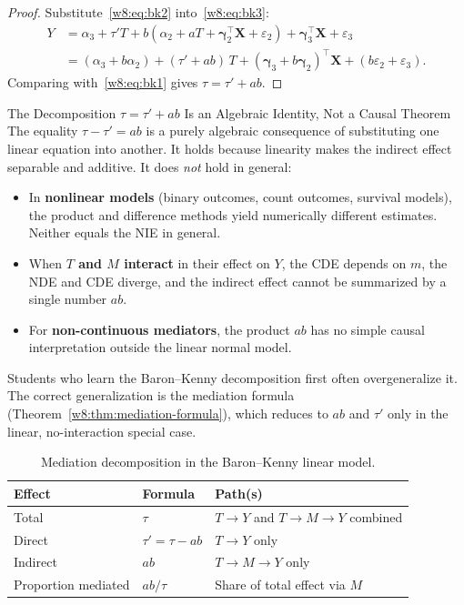 \documentclass[master.tex]{subfiles}
\begin{document}
\begin{proof}
Substitute~\eqref{w8:eq:bk2} into~\eqref{w8:eq:bk3}:
\begin{align*}
  Y &= \alpha_3 + \tau' T
       + b(\alpha_2 + aT + \boldsymbol{\gamma}_2^{\top}\mathbf{X}
           + \varepsilon_2)
       + \boldsymbol{\gamma}_3^{\top}\mathbf{X} + \varepsilon_3 \\
    &= (\alpha_3 + b\alpha_2)
       + (\tau' + ab)\,T
       + (\boldsymbol{\gamma}_3 + b\boldsymbol{\gamma}_2)^{\top}\mathbf{X}
       + (b\varepsilon_2 + \varepsilon_3).
\end{align*}
Comparing with~\eqref{w8:eq:bk1} gives $\tau = \tau' + ab$.
\end{proof}

\begin{warn}{The Decomposition $\tau = \tau' + ab$ Is an Algebraic
  Identity, Not a Causal Theorem}
\label{w8:warn:bk-algebraic}
The equality $\tau - \tau' = ab$ is a purely algebraic consequence of
substituting one linear equation into another.  It holds because
linearity makes the indirect effect separable and additive.  It does
\emph{not} hold in general:
\begin{itemize}
  \item In \textbf{nonlinear models} (binary outcomes, count outcomes,
    survival models), the product and difference methods yield
    numerically different estimates.  Neither equals the NIE in general.
  \item When \textbf{$T$ and $M$ interact} in their effect on $Y$,
    the CDE depends on $m$, the NDE and CDE diverge, and the indirect
    effect cannot be summarized by a single number $ab$.
  \item For \textbf{non-continuous mediators}, the product $ab$ has no
    simple causal interpretation outside the linear normal model.
\end{itemize}
Students who learn the Baron--Kenny decomposition first often
overgeneralize it.  The correct generalization is the mediation formula
(Theorem~\ref{w8:thm:mediation-formula}), which reduces to $ab$ and
$\tau'$ only in the linear, no-interaction special case.
\end{warn}

\begin{table}[h]
\centering
\renewcommand{\arraystretch}{1.5}
\begin{tabular}{@{}lll@{}}
\toprule
\textbf{Effect} & \textbf{Formula} & \textbf{Path(s)} \\
\midrule
Total        & $\tau$          & $T \to Y$ and $T \to M \to Y$ combined \\
Direct       & $\tau' = \tau - ab$ & $T \to Y$ only \\
Indirect     & $ab$            & $T \to M \to Y$ only \\
Proportion mediated & $ab/\tau$ & Share of total effect via $M$ \\
\bottomrule
\end{tabular}
\caption{Mediation decomposition in the Baron--Kenny linear model.}
\label{w8:tab:decomp}
\end{table}
\end{document}
